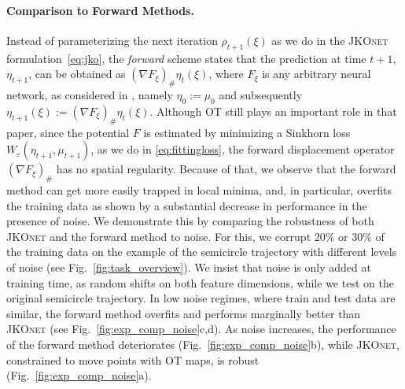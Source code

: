 \paragraph{Comparison to Forward Methods.} \label{sec:eval_comp_fb}
Instead of parameterizing the next iteration $\rho_{t+1}(\xi)$ as we do in the \textsc{JKOnet} formulation~\eqref{eq:jko}, the \emph{forward} scheme states that the prediction at time $t+1$, $\eta_{t+1}$, can be obtained as $(\nabla F_\xi)_{\#} \eta_t(\xi)$, where $F_\xi$ is any arbitrary neural network, as considered in \citet{hashimoto2016learning}, namely $\eta_0:=\mu_0$ and subsequently $\eta_{t+1}(\xi):=(\nabla F_\xi)_{\#} \eta_t(\xi)$. Although OT still plays an important role in that paper, since the potential $F$ is estimated by minimizing a Sinkhorn loss $W_\varepsilon(\eta_{t+1},\mu_{t+1})$, as we do in \eqref{eq:fittingloss}, the forward displacement operator $(\nabla F_\xi)_{\#}$ has no spatial regularity. Because of that, we observe that the forward method can get more easily trapped in local minima, and, in particular, overfits the training data as shown by a substantial decrease in performance in the presence of noise.
We demonstrate this by comparing the robustness of both \textsc{JKOnet} and the forward method to noise. For this, we corrupt $20\%$ or $30\%$ of the training data on the example of the semicircle trajectory with different levels of noise (see Fig.~\ref{fig:task_overview}). We insist that noise is only added at training time, as random shifts on both feature dimensions, while we test on the original semicircle trajectory.
In low noise regimes, where train and test data are similar, the forward method overfits and performs marginally better than \textsc{JKOnet} (see Fig.~\ref{fig:exp_comp_noise}c,d). As noise increases, the performance of the forward method deteriorates (Fig.~\ref{fig:exp_comp_noise}b), while \textsc{JKOnet}, constrained to move points with OT maps, is robust (Fig.~\ref{fig:exp_comp_noise}a).%



